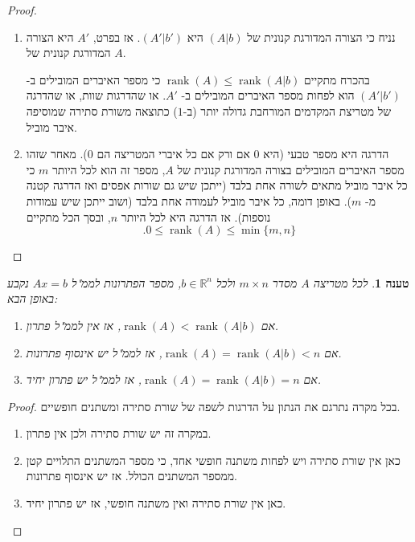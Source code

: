 \documentclass[12pt]{report}
\theoremstyle{plain}
\newtheorem{proposition}[theorem]{טענה}
\theoremstyle{definition}
\newcommand{\R}{\mathbb{R}}
\DeclareMathOperator{\rank}{rank}
\newcommand{\0}{\mathbf{0}}
\begin{document}
\begin{proof}\
\begin{enumerate}[label=\alph*.]
\item
נניח כי הצורה המדורגת קנונית של
$(A|b)$
היא
$(A'|b')$.
אז בפרט,
$A'$
היא הצורה המדורגת קנונית של
$A$.

בהכרח מתקיים
$
\rank(A)\leq\rank(A|b)
$
כי מספר האיברים המובילים ב-
$(A'|b')$
הוא לפחות מספר האיברים המובילים ב-
$A'$.
או שהדרגות שוות, או שהדרגה של מטריצת המקדמים המורחבת גדולה יותר (ב-$1$) כתוצאה משורת סתירה שמוסיפה איבר מוביל.

\item 

הדרגה היא מספר טבעי (היא
$0$
אם ורק אם כל איברי המטריצה הם
$0$).
מאחר שזהו מספר האיברים המובילים בצורה המדורגת קנונית של
$A$,
מספר זה הוא לכל היותר 
$m$
כי כל איבר מוביל מתאים לשורה אחת בלבד (ייתכן שיש גם שורות אפסים ואז הדרגה קטנה מ-
$m$).
באופן דומה, כל איבר מוביל לעמודה אחת בלבד (ושוב ייתכן שיש עמודות נוספות). אז הדרגה היא לכל היותר 
$n$,
ובסך הכל מתקיים
$$
.0\leq\rank(A)\leq\min\{m,n\}
$$

\end{enumerate}
\end{proof}

\begin{proposition}\label{prop:rank-number}
לכל מטריצה
$A$
מסדר
$m\times n$
ולכל 
$b\in\R^n$,
מספר הפתרונות לממ"ל
$Ax=b$
נקבע באופן הבא:
\begin{enumerate}[label=\alph*.]
\item
אם
$\rank(A)<\rank(A|b)$,
אז אין לממ"ל פתרון.


\item
אם
$\rank(A)=\rank(A|b)<n$,
אז לממ"ל יש אינסוף פתרונות.


\item
אם
$\rank(A)=\rank(A|b)=n$,
אז לממ"ל יש פתרון יחיד.


\end{enumerate}
\end{proposition}

\begin{proof}
בכל מקרה נתרגם את הנתון על הדרגות לשפה של שורת סתירה ומשתנים חופשיים.

\begin{enumerate}[label=\alph*.]
\item במקרה זה יש שורת סתירה ולכן אין פתרון.
\item כאן אין שורת סתירה ויש לפחות משתנה חופשי אחד, כי מספר המשתנים התלויים קטן ממספר המשתנים הכולל. אז יש אינסוף פתרונות.
\item כאן אין שורת סתירה ואין משתנה חופשי, אז יש פתרון יחיד.
\end{enumerate}
\end{proof}
\end{document}
